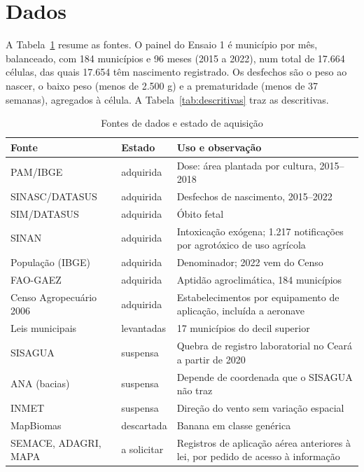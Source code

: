 \section{Dados}
\label{sec:dados}

A Tabela~\ref{tab:fontes} resume as fontes. O painel do Ensaio 1 é município
por mês, balanceado, com 184 municípios e 96 meses (2015 a 2022), num total de
17.664 células, das quais 17.654 têm nascimento registrado. Os desfechos são o
peso ao nascer, o baixo peso (menos de 2.500 g) e a prematuridade (menos de 37
semanas), agregados à célula. A Tabela~\ref{tab:descritivas} traz as
descritivas. 

\begin{table}[htb]
\centering
\caption{Fontes de dados e estado de aquisição}
\label{tab:fontes}
\small
\begin{tabular}{p{3.6cm}p{2.1cm}p{8.0cm}}
\toprule
Fonte & Estado & Uso e observação \\
\midrule
PAM/IBGE         & adquirida   & Dose: área plantada por cultura, 2015--2018 \\
SINASC/DATASUS   & adquirida   & Desfechos de nascimento, 2015--2022 \\
SIM/DATASUS      & adquirida   & Óbito fetal \\
SINAN            & adquirida   & Intoxicação exógena; 1.217 notificações por
                                 agrotóxico de uso agrícola \\
População (IBGE) & adquirida   & Denominador; 2022 vem do Censo \\
FAO-GAEZ         & adquirida   & Aptidão agroclimática, 184 municípios \\
Censo Agropecuário 2006 & adquirida & Estabelecimentos por equipamento de
                                 aplicação, incluída a aeronave \\
Leis municipais  & levantadas  & 17 municípios do decil superior \\
SISAGUA          & suspensa    & Quebra de registro laboratorial no Ceará a
                                 partir de 2020 \\
ANA (bacias)     & suspensa    & Depende de coordenada que o SISAGUA não traz \\
INMET            & suspensa    & Direção do vento sem variação espacial \\
MapBiomas        & descartada  & Banana em classe genérica \\
SEMACE, ADAGRI, MAPA & a solicitar & Registros de aplicação aérea anteriores
                                 à lei, por pedido de acesso à informação \\
\bottomrule
\end{tabular}
\end{table}

